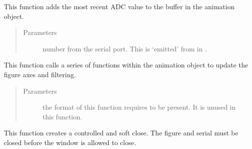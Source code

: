 \documentclass[letterpaper,10pt,english]{sphinxmanual}
\begin{document}
\begin{fulllineitems}
\begin{fulllineitems}
\end{fulllineitems}


\begin{fulllineitems}
\label{\detokenize{plotGUI:plotGUI.Ui_Dialog.addData_callbackFunc}}
This function adds the most recent ADC value to the buffer in the animation object.
\begin{quote}\begin{description}
\item[{Parameters}] \leavevmode
{} \textendash{} number from the serial port. This is ‘emitted’ from  in .

\end{description}\end{quote}

\end{fulllineitems}


\begin{fulllineitems}
\label{\detokenize{plotGUI:plotGUI.Ui_Dialog.update_plot}}
This function calls a series of functions within the animation object to update the figure axes and filtering.
\begin{quote}\begin{description}
\item[{Parameters}] \leavevmode
{} \textendash{} the format of this function requires  to be present. It is unused in this function.

\end{description}\end{quote}

\end{fulllineitems}


\begin{fulllineitems}
\label{\detokenize{plotGUI:plotGUI.Ui_Dialog.close}}
This function creates a controlled and soft close.
The figure and serial must be closed before the window is allowed to close.


\end{fulllineitems}
\end{fulllineitems}
\end{document}
